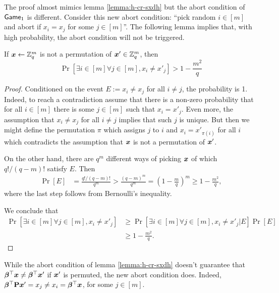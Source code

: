 The proof almost mimics lemma \ref{lemma:h-cr-sxdh} but the abort condition of $\mathsf{Game}_1$ is different. 
Consider this new abort condition: ``pick random $i\in[m]$ and abort if $x_i=x_j$ for some $j\in[m]$''. The following lemma implies that, with high probability, the abort condition will not be triggered.
\begin{lemma}
If ${\boldsymbol{x}}\gets\mathbb{Z}_q^m$ is not a permutation of ${\boldsymbol{x}}'\in\mathbb{Z}_q^m$, then
$$
\Pr[\exists i\in[m] \forall j\in[m], x_i\neq x'_j] > 1-\frac{m^2}{q}
$$
\end{lemma}
\begin{proof}
Conditioned on the event $E:=x_i\neq x_j$ for all $i\neq j$, the probability is 1. Indeed, to reach a contradiction assume that there is a non-zero probability that for all $i\in[m]$ there is some $j\in[m]$ such that $x_i=x'_j$. Even more, the assumption that $x_i\neq x_j$ for all $i\neq j$ implies that such $j$ is unique. But then we might define the permutation $\pi$ which assigns $j$ to $i$ and $x_i = x'_{\pi(i)}$ for all $i$ which contradicts the assumption that ${\boldsymbol{x}}$ is not a permutation of ${\boldsymbol{x}}'$.

On the other hand, there are $q^m$ different ways of picking ${\boldsymbol{x}}$ of which $q!/(q-m)!$ satisfy $E$. Then
\begin{align*}
\Pr[E] & = \frac{q!/(q-m)!}{q^m} > \frac{(q-m)^m}{q^m} = \left(1-\frac{m}{q}\right)^m \geq 1-\frac{m^2}{q},
\end{align*}
where the last step follows from Bernoulli's inequality.

We conclude that
\begin{align*}
\Pr[\exists i\in[m] \forall j\in[m], x_i\neq x'_j] &\geq  \Pr[\exists i\in[m] \forall j\in[m], x_i\neq x'_j|E]\Pr[E]\\
& \geq 1-\frac{m^2}{q}.
\end{align*}
\end{proof}
 While the abort condition of lemma \ref{lemma:h-cr-sxdh} doesn't guarantee that ${\boldsymbol{\beta}}^\top {\boldsymbol{x}} \neq {\boldsymbol{\beta}}^\top {\boldsymbol{x}}'$ if ${\boldsymbol{x}}'$ is permuted, the new abort condition does. Indeed, ${\boldsymbol{\beta}}^\top\mathbf{{P}}{\boldsymbol{x}}' = x_j\neq x_i = {\boldsymbol{\beta}}^\top{\boldsymbol{x}}$, for some $j\in[m]$.
 
